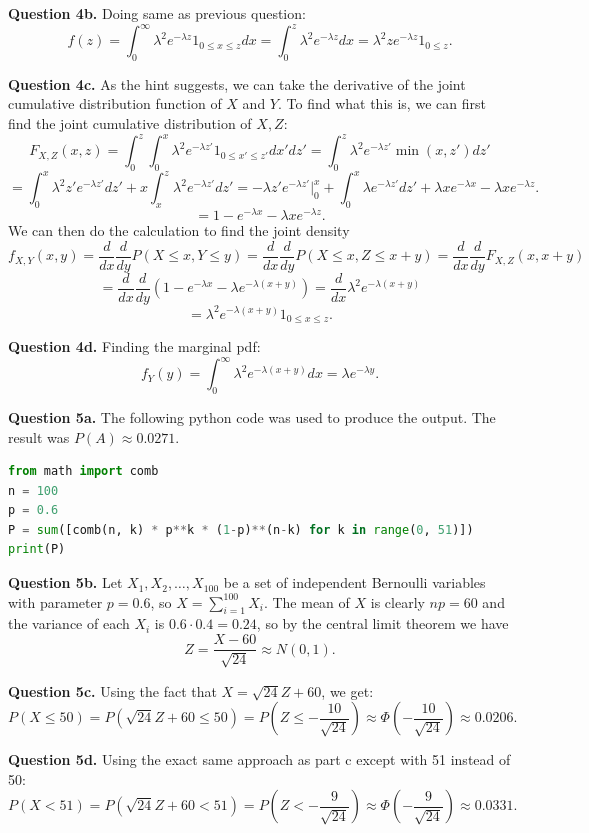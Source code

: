\documentclass[letterpaper, reqno,11pt]{article}
\begin{document}
{\medskip\noindent\bf Question 4b.} Doing same as previous question: 
\[
f(z)=\int_0^{\infty}\lambda^2e^{-\lambda z}1_{0\leq x\leq z}dx=\int_0^{z}\lambda^2e^{-\lambda z}dx=\lambda^2z e^{-\lambda z}1_{0\leq z}
.\]

{\medskip\noindent\bf Question 4c.} As the hint suggests, we can take the derivative of the joint cumulative distribution function of $X$ and $Y$. To find what this is, we can first find the joint cumulative distribution of $X,Z$: 
\[
F_{X,Z}(x,z)=\int_0^{z}\int_0^{x}\lambda^2e^{-\lambda z'}1_{0\leq x'\leq z'}dx'dz'=\int_0^{z}\lambda^2e^{-\lambda z'}\min(x,z')dz'
\]
\[
=\int_0^{x}\lambda^2z' e^{-\lambda z'}dz'+x\int_x^{z}\lambda^2e^{-\lambda z'}dz'=-\lambda z'e^{-\lambda z'}\bigg|_0^x+\int_0^x\lambda e^{-\lambda z'}dz'+\lambda xe^{-\lambda x}-\lambda x e^{-\lambda z}
.\]
\[
=1-e^{-\lambda x}-\lambda xe^{-\lambda z}
.\]
We can then do the calculation to find the joint density
\[
f_{X,Y}(x,y)=\frac{d}{dx}\frac{d}{dy}P(X\leq x,Y\leq y)=\frac{d}{dx}\frac{d}{dy}P(X\leq x, Z\leq x+y)=\frac{d}{dx}\frac{d}{dy}F_{X,Z}(x,x+y)
\]
\[
=\frac{d}{dx}\frac{d}{dy}\left( 1-e^{-\lambda x}-\lambda e^{-\lambda (x+y)} \right) =\frac{d}{dx}\lambda^2 e^{-\lambda(x+y)} 
\]
\[
=\lambda ^2e^{-\lambda(x+y)}1_{0\leq x\leq z}
.\]

{\medskip\noindent\bf Question 4d.} Finding the marginal pdf: 
\[
f_Y(y)=\int_0^{\infty}\lambda^2e^{-\lambda(x+y)}dx=\lambda e^{-\lambda y}
.\]

{\medskip\noindent\bf Question 5a.} The following python code was used to produce the output. The result was $P(A)\approx 0.0271$. 

\begin{lstlisting}[language=Python]
from math import comb
n = 100
p = 0.6
P = sum([comb(n, k) * p**k * (1-p)**(n-k) for k in range(0, 51)])
print(P)
\end{lstlisting}

{\medskip\noindent\bf Question 5b.} Let $X_1, X_2,\ldots, X_{100}$ be a set of independent Bernoulli variables with parameter $p=0.6$, so $X=\sum_{i=1}^{100}X_i$. The mean of $X$ is clearly $np=60$ and the variance of each $X_i$ is $0.6\cdot 0.4=0.24$, so by the central limit theorem we have 
\[
Z=\frac{X-60}{\sqrt{24} }\approx N(0,1)
.\]

{\medskip\noindent\bf Question 5c.} Using the fact that $X=\sqrt{24} Z+60$, we get: 
\[
P(X\leq 50)= P(\sqrt{24} Z+60\leq 50)=P(Z\leq -\frac{10}{\sqrt{24} })\approx \Phi(-\frac{10}{\sqrt{24} })\approx 0.0206
.\]

{\medskip\noindent\bf Question 5d.} Using the exact same approach as part c except with 51 instead of 50: 
\[
P(X< 51)= P(\sqrt{24} Z+60< 51)=P(Z<-\frac{9}{\sqrt{24} })\approx \Phi(-\frac{9}{\sqrt{24} })\approx 0.0331
.\]
\end{document}
